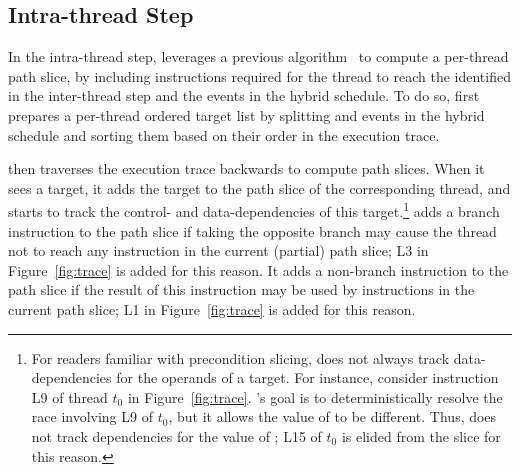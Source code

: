 
\subsection{Intra-thread Step} \label{sec:intrathread-slice}


In the intra-thread step, \peregrine leverages a previous
algorithm~\cite{castro:bouncer} to compute a per-thread path slice,
by including instructions required for the thread to reach the
 identified in the inter-thread step and the events in
the hybrid schedule.  To do so, \peregrine first prepares a per-thread ordered
target list by splitting  and events in the hybrid
schedule and sorting them based on their order in the execution trace.

\peregrine then traverses the execution trace backwards to compute path slices.
When it sees a target, it adds the target to the path slice of the
corresponding thread, and starts to track the control- and
data-dependencies of this target.\footnote{For readers familiar with
  precondition slicing, \peregrine does not always track data-dependencies for
  the operands of a target.  For instance, consider instruction
  L9 of thread $t_0$ in Figure~\ref{fig:trace}.  \peregrine's goal is
  to deterministically resolve the race involving L9 of $t_0$, but it
  allows the value of  to be different.  Thus, \peregrine does not
  track dependencies for the value of ; L15 of $t_0$ is elided
  from the slice for this reason.}  \peregrine adds a branch
instruction to the path slice if taking the opposite branch may cause the
thread not to reach any instruction in the current (partial) path slice;
L3 in Figure~\ref{fig:trace} is added for this reason.
It adds a non-branch instruction to the path slice if the result of this
instruction may be used by instructions in the current path slice;
L1 in Figure~\ref{fig:trace} is added for this reason.

